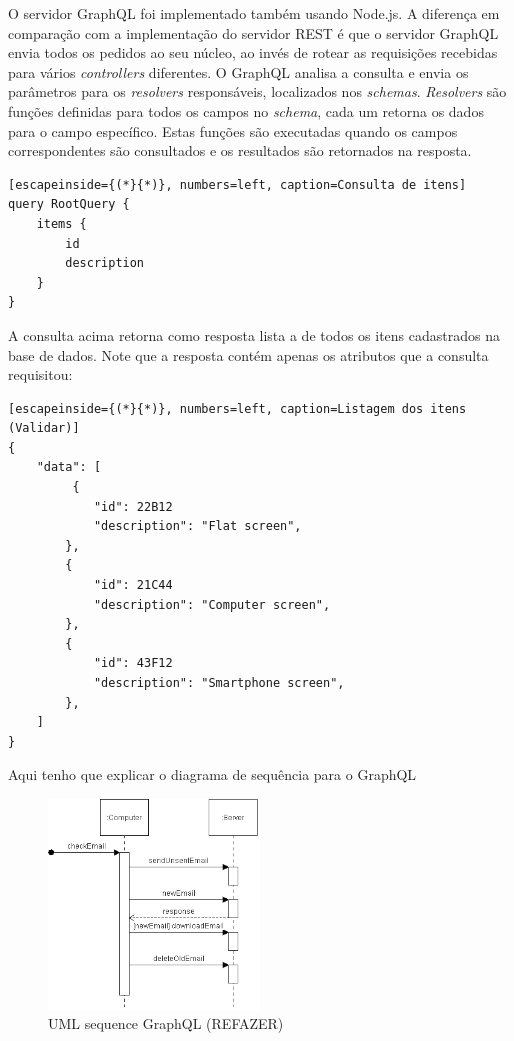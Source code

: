 O servidor GraphQL foi implementado também usando Node.js. A diferença em comparação com a implementação do servidor REST é que o servidor GraphQL envia todos os pedidos ao seu núcleo, ao invés de rotear as requisições recebidas para vários \textit{controllers} diferentes. O GraphQL analisa a consulta e envia os parâmetros para os \textit{resolvers} responsáveis, localizados nos \textit{schemas}. \textit{Resolvers} são funções definidas para todos os campos no \textit{schema}, cada um retorna os dados para o campo específico. Estas funções são executadas quando os campos correspondentes são consultados e os resultados são retornados na resposta.

\begin{lstlisting}[escapeinside={(*}{*)}, numbers=left, caption=Consulta de itens]
query RootQuery {
	items {
    	id
    	description
    }
}

\end{lstlisting}

 A consulta acima retorna como resposta lista a de todos os itens cadastrados na base de dados. Note que a resposta contém apenas os atributos que a consulta requisitou:

\begin{lstlisting}[escapeinside={(*}{*)}, numbers=left, caption=Listagem dos itens (Validar)]
{
    "data": [
         {
        	"id": 22B12
            "description": "Flat screen",
        },
        {
        	"id": 21C44
            "description": "Computer screen",
        },
        {
        	"id": 43F12
            "description": "Smartphone screen",
        },
    ]
}

\end{lstlisting}

Aqui tenho que explicar o diagrama de sequência para o GraphQL

\begin{figure}[htbp]
\centering
\includegraphics[width=0.5\textwidth]{figuras/uml-sequence.png}
\caption{UML sequence GraphQL (REFAZER)}
\label{fig:graph-uml}
\author{fonte: Autor}
\end{figure}

